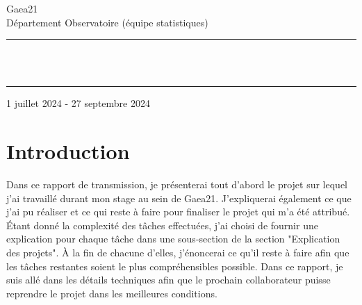 \documentclass[12pt]{article}
\begin{document}
\newcommand{\HRule}{\rule{\linewidth}{0.5mm}}
\newcommand\myfontsize{\fontsize{12.5pt}{1pt}\selectfont}

\begin{titlepage}
    \begin{center}
        Gaea21\\
        Département Observatoire (équipe statistiques)
        \vspace{2.5cm}

        \vspace{0.15cm}
        \vspace{5cm}
        \HRule
        \vspace{0.5cm}\\
        \textsc{\myfontsize{Rapport de transmission de Basma Ghaffour}}
        \vspace{0.5cm}\\
        \HRule
        \vspace*{0.5cm}


        \begin{minipage}[t]{0.45\textwidth}
            \raggedright 
     
        \end{minipage}
        \hfill %
        \begin{minipage}[t]{0.45\textwidth}
            \raggedleft
            \large 
            
        \end{minipage}
        \vspace{0.5cm}

        \vfill %

        \large{1 juillet 2024 - 27 septembre 2024}
    \end{center}
\end{titlepage}


\newpage


\tableofcontents

\newpage


\section{Introduction}
Dans ce rapport de transmission, je présenterai tout d'abord le projet sur lequel 
j'ai travaillé durant mon stage au sein de Gaea21. J'expliquerai également ce que 
j'ai pu réaliser et ce qui reste à faire pour finaliser le projet qui m'a été attribué. 
Étant donné la complexité des tâches effectuées, j'ai choisi de fournir une explication 
pour chaque tâche dans une sous-section de la section "Explication des projets". À la fin 
de chacune d'elles, j'énoncerai ce qu'il reste à faire afin que les tâches restantes soient
 le plus compréhensibles possible. Dans ce rapport, je suis allé dans les détails techniques 
 afin que le prochain collaborateur puisse reprendre le projet dans les meilleures conditions.
\end{document}
